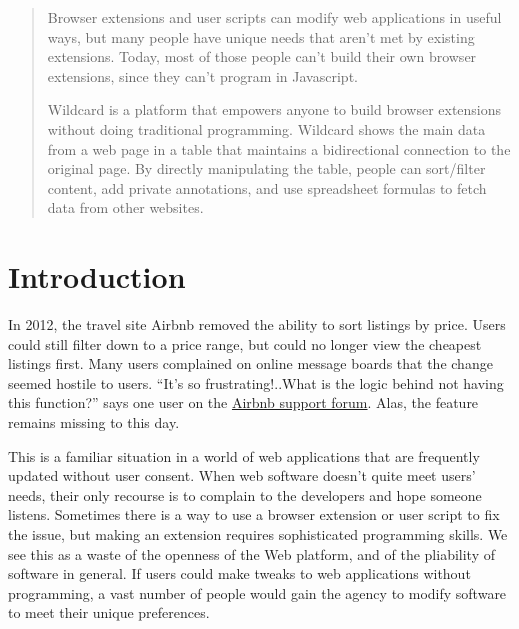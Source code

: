 \documentclass[english,submission]{programming}
\begin{document}
\begin{abstract}
Browser extensions and user scripts can modify web applications in
useful ways, but many people have unique needs that aren't met by
existing extensions. Today, most of those people can't build their own
browser extensions, since they can't program in Javascript.

Wildcard is a platform that empowers anyone to build browser extensions
without doing traditional programming. Wildcard shows the main data from
a web page in a table that maintains a bidirectional connection to the
original page. By directly manipulating the table, people can
sort/filter content, add private annotations, and use spreadsheet
formulas to fetch data from other websites.
\end{abstract}


\hypertarget{introduction}{%
\section{Introduction}\label{introduction}}

In 2012, the travel site Airbnb removed the ability to sort listings by
price. Users could still filter down to a price range, but could no
longer view the cheapest listings first. Many users complained on online
message boards that the change seemed hostile to users. ``It's so
frustrating!..What is the logic behind not having this function?'' says
one user on the
\href{https://community.withairbnb.com/t5/Hosting/Sorting-listing-by-price/td-p/559404}{Airbnb
support forum}. Alas, the feature remains missing to this day.

This is a familiar situation in a world of web applications that are
frequently updated without user consent. When web software doesn't quite
meet users' needs, their only recourse is to complain to the developers
and hope someone listens. Sometimes there is a way to use a browser
extension or user script to fix the issue, but making an extension
requires sophisticated programming skills. We see this as a waste of the
openness of the Web platform, and of the pliability of software in
general. If users could make tweaks to web applications without
programming, a vast number of people would gain the agency to modify
software to meet their unique preferences.
\end{document}

